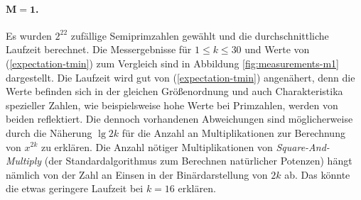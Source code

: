 \documentclass[a4paper, 10pt, ngerman]{article}
\begin{document}
    \paragraph{$\pmb{M = 1}$.} Es wurden $2^{22}$ zufällige Semiprimzahlen gewählt und die durchschnittliche Laufzeit berechnet. Die Messergebnisse für $1 \le k \le 30$ und Werte von (\ref{expectation-tmin}) zum Vergleich sind in Abbildung \ref{fig:measurements-m1} dargestellt. Die Laufzeit wird gut von (\ref{expectation-tmin}) angenähert, denn die Werte befinden sich in der gleichen Größenordnung und auch Charakteristika spezieller Zahlen, wie beispielsweise hohe Werte bei Primzahlen, werden von beiden reflektiert. Die dennoch vorhandenen Abweichungen sind möglicherweise durch die Näherung $\lg 2k$ für die Anzahl an Multiplikationen zur Berechnung von $x^{2k}$ zu erklären. Die Anzahl nötiger Multiplikationen von \emph{Square-And-Multiply} (der Standardalgorithmus zum Berechnen natürlicher Potenzen) hängt nämlich von der Zahl an Einsen in der Binärdarstellung von $2k$ ab. Das könnte die etwas geringere Laufzeit bei $k = 16$ erklären.
\end{document}
